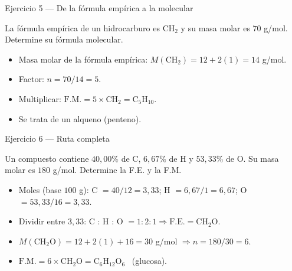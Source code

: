 \documentclass[aspectratio=169]{beamer}
\newcommand{\pc}{\text{\%}}
\begin{document}
\begin{frame}{Ejercicio 5 — De la fórmula empírica a la molecular}
  \mwtopanchoroff
  \begin{mwejercicio}
    La fórmula empírica de un hidrocarburo es $\text{CH}_2$ y su masa molar es
    $70$ g/mol. Determine su fórmula molecular.
  \end{mwejercicio}
  \vspace{2pt}
  \begin{mwpasos}[Resolución]
    \begin{itemize}
      \item Masa molar de la fórmula empírica: $M(\text{CH}_2) = 12 + 2(1) = 14$ g/mol.
      \item Factor: $n = 70/14 = 5$.
      \item Multiplicar: $\text{F.M.} = 5\times\text{CH}_2 = \boxed{\text{C}_5\text{H}_{10}}$.
      \item Se trata de un alqueno (penteno).
    \end{itemize}
  \end{mwpasos}
  \mwtopanchoron
\end{frame}

\begin{frame}{Ejercicio 6 — Ruta completa}
  \mwtopanchoroff
  \begin{mwejercicio}
    Un compuesto contiene $40{,}00\pc$ de C, $6{,}67\pc$ de H y $53{,}33\pc$ de O.
    Su masa molar es $180$ g/mol. Determine la F.E. y la F.M.
  \end{mwejercicio}
  \vspace{2pt}
  \begin{mwpasos}[Resolución]
    \small
    \begin{itemize}
      \item Moles (base $100$ g): C $=40/12 = 3{,}33$; H $=6{,}67/1 = 6{,}67$; O $=53{,}33/16 = 3{,}33$.
      \item Dividir entre $3{,}33$: C : H : O $= 1 : 2 : 1 \Rightarrow \text{F.E.} = \text{CH}_2\text{O}$.
      \item $M(\text{CH}_2\text{O}) = 12 + 2(1) + 16 = 30$ g/mol $\Rightarrow n = 180/30 = 6$.
      \item $\text{F.M.} = 6\times\text{CH}_2\text{O} = \boxed{\text{C}_6\text{H}_{12}\text{O}_6}$ \ (glucosa).
    \end{itemize}
  \end{mwpasos}
  \mwtopanchoron
\end{frame}
\end{document}
